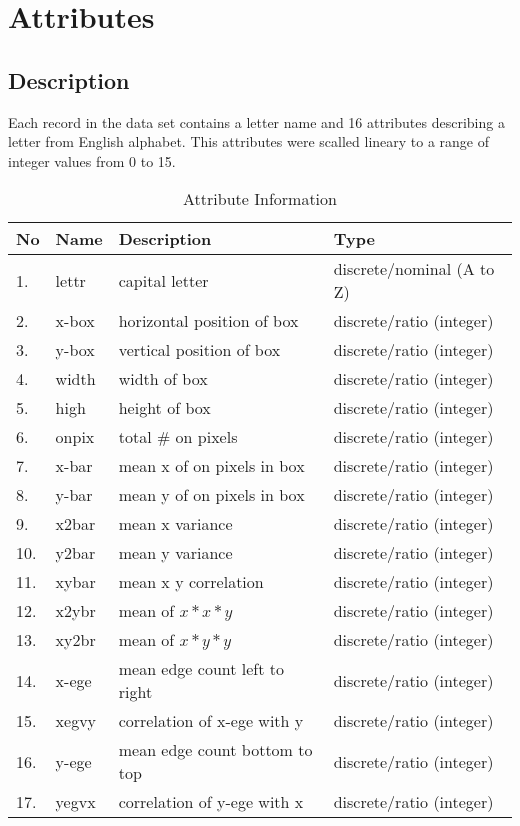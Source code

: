 \chapter*{Attributes}
\section*{Description}
Each record in the data set contains a letter name and 16 attributes describing
a letter from English alphabet. This attributes were scalled lineary to a range
of integer values from 0 to 15.

\begin{table}[ht!]
    \centering
    \begin{tabular}{|l|l|l|l|}
         \hline
             No & Name & Description & Type \\ \hline
             1. & lettr & capital letter             & discrete/nominal (A to Z)  \\ \hline
             2. & x-box & horizontal position of box & discrete/ratio (integer)   \\ \hline
             3. & y-box & vertical position of box   & discrete/ratio (integer)   \\ \hline
             4. & width & width of box               & discrete/ratio (integer)   \\ \hline
             5. & high  & height of box              & discrete/ratio (integer)   \\ \hline
             6. & onpix & total \# on pixels         & discrete/ratio (integer)   \\ \hline
             7. & x-bar & mean x of on pixels in box & discrete/ratio (integer)   \\ \hline
             8. & y-bar & mean y of on pixels in box & discrete/ratio (integer)   \\ \hline
             9. & x2bar & mean x variance            & discrete/ratio (integer)   \\ \hline
            10. & y2bar & mean y variance            & discrete/ratio (integer)   \\ \hline
            11. & xybar & mean x y correlation       & discrete/ratio (integer)   \\ \hline
            12. & x2ybr & mean of $x * x * y$        & discrete/ratio (integer)   \\ \hline
            13. & xy2br & mean of $x * y * y$        & discrete/ratio (integer)   \\ \hline
            14. & x-ege & mean edge count left to right  & discrete/ratio (integer) \\ \hline
            15. & xegvy & correlation of x-ege with y    & discrete/ratio (integer) \\ \hline
            16. & y-ege & mean edge count bottom to top  & discrete/ratio (integer) \\ \hline
            17. & yegvx & correlation of y-ege with x    & discrete/ratio (integer) \\ \hline
    \end{tabular}
    \caption{Attribute Information}
\end{table}

